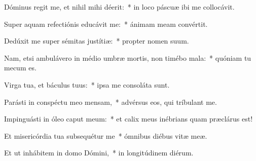 \item Dóminus regit me, et nihil mihi déerit:~* in loco páscuæ ibi me collocávit.

\item Super aquam refectiónis educávit me:~* ánimam meam convértit.

\item Dedúxit me super sémitas justítiæ:~* propter nomen suum.

\item Nam, etsi ambulávero in médio umbræ mortis, non timébo mala:~* quóniam tu mecum es.

\item Virga tua, et báculus tuus:~* ipsa me consoláta sunt.

\item Parásti in conspéctu meo mensam,~* advérsus eos, qui tríbulant me.

\item Impinguásti in óleo caput meum:~* et calix meus inébrians quam præclárus est!

\item Et misericórdia tua subsequétur me~* ómnibus diébus vitæ meæ.

\item Et ut inhábitem in domo Dómini,~* in longitúdinem diérum.

